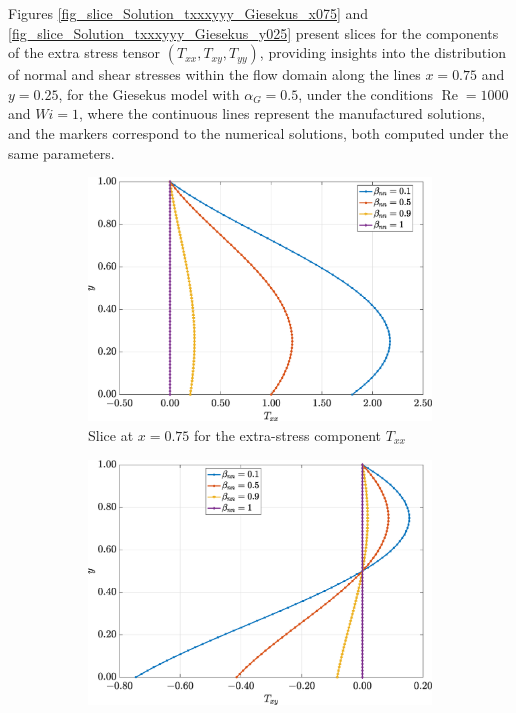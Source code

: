 \documentclass[preprint, 12pt]{elsarticle}
\begin{document}
Figures \ref{fig_slice_Solution_txxxyyy_Giesekus_x075} and \ref{fig_slice_Solution_txxxyyy_Giesekus_y025} present slices for the components of the extra stress tensor $(T_{xx}, T_{xy}, T_{yy})$, providing insights into the distribution of normal and shear stresses within the flow domain along the lines $x=0.75$ and $y=0.25$, for the Giesekus model with $\alpha_G = 0.5$, under the conditions $\operatorname{Re}=1000$ and $Wi=1$, where the continuous lines represent the manufactured solutions, and the markers correspond to the numerical solutions, both computed under the same parameters.
\begin{figure}[H]
    \centering
    \begin{subfigure}[b]{.46\textwidth}
        \includegraphics[width=\textwidth]{Slice_x_Tog_Numerical_NormErr_2nd_Betann_1_Re_1000_Wi_1_epsilon_0_xi_0_alphaG_0.5_Dt_1e-06_at_0.05_tipsim_1_MMS_12_x0.75y0.75_Txx.eps}
        \caption{Slice at $x=0.75$ for the extra-stress component $T_{xx}$}
        \label{fig_slice_y_txx_2nd_Case1_giesekus_x075}
    \end{subfigure}
    \vspace{0.2cm}
    \qquad
    \begin{subfigure}[b]{.46\textwidth}
        \includegraphics[width=\textwidth]{Slice_x_Tog_Numerical_NormErr_2nd_Betann_1_Re_1000_Wi_1_epsilon_0_xi_0_alphaG_0.5_Dt_1e-06_at_0.05_tipsim_1_MMS_12_x0.75y0.75_Txy.eps}

\end{subfigure}
\end{figure}
\end{document}
